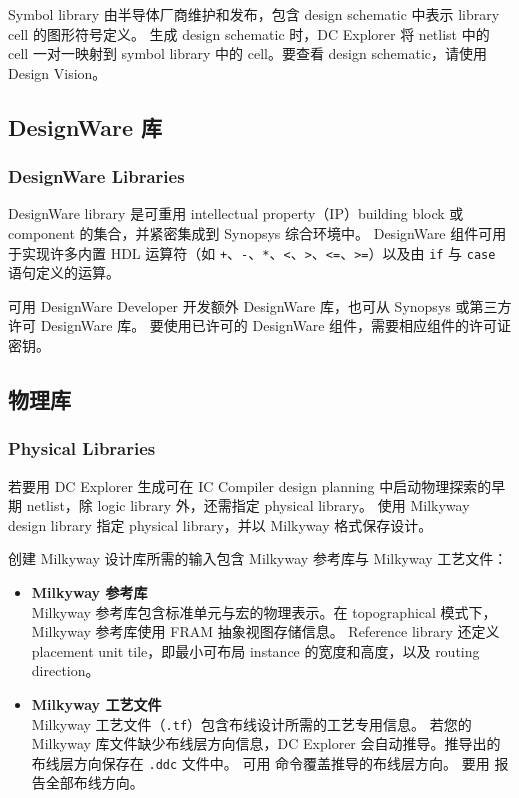 Symbol library 由半导体厂商维护和发布，包含 design schematic 中表示 library cell 的图形符号定义。
生成 design schematic 时，DC Explorer 将 netlist 中的 cell 一对一映射到 symbol library 中的 cell。要查看 design schematic，请使用 Design Vision。

\subsection{DesignWare 库}
\subsubsection*{DesignWare Libraries}

DesignWare library 是可重用 intellectual property（IP）building block 或 component 的集合，并紧密集成到 Synopsys 综合环境中。
DesignWare 组件可用于实现许多内置 HDL 运算符（如 \texttt{+}、\texttt{-}、\texttt{*}、\texttt{<}、\texttt{>}、\texttt{<=}、\texttt{>=}）以及由 \texttt{if} 与 \texttt{case} 语句定义的运算。

可用 DesignWare Developer 开发额外 DesignWare 库，也可从 Synopsys 或第三方许可 DesignWare 库。
要使用已许可的 DesignWare 组件，需要相应组件的许可证密钥。

\subsection{物理库}
\subsubsection*{Physical Libraries}

若要用 DC Explorer 生成可在 IC Compiler design planning 中启动物理探索的早期 netlist，除 logic library 外，还需指定 physical library。
使用 Milkyway design library 指定 physical library，并以 Milkyway 格式保存设计。

创建 Milkyway 设计库所需的输入包含 Milkyway 参考库与 Milkyway 工艺文件：
\begin{itemize}
  \item \textbf{Milkyway 参考库}\\
        Milkyway 参考库包含标准单元与宏的物理表示。在 topographical 模式下，Milkyway 参考库使用 FRAM 抽象视图存储信息。
        Reference library 还定义 placement unit tile，即最小可布局 instance 的宽度和高度，以及 routing direction。

  \item \textbf{Milkyway 工艺文件}\\
        Milkyway 工艺文件（\texttt{.tf}）包含布线设计所需的工艺专用信息。
        若您的 Milkyway 库文件缺少布线层方向信息，DC Explorer 会自动推导。推导出的布线层方向保存在 \texttt{.ddc} 文件中。
        可用  命令覆盖推导的布线层方向。
        要用  报告全部布线方向。
\end{itemize}

